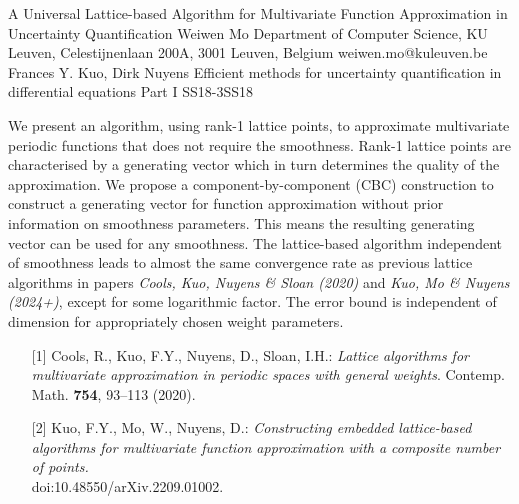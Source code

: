\begin{talk}
  {A Universal Lattice-based Algorithm for Multivariate Function Approximation in Uncertainty Quantification}%
  {Weiwen Mo}%
  {Department of Computer Science, KU Leuven, Celestijnenlaan 200A, 3001 Leuven, Belgium}%
  {weiwen.mo@kuleuven.be}%
  {Frances Y. Kuo, Dirk Nuyens}%
{Efficient methods for uncertainty quantification in differential equations Part I}
{}{SS18-3}{SS18}

			
We present an algorithm, using rank-1 lattice points,  to approximate multivariate periodic functions that does not require the smoothness. Rank-1 lattice points are characterised by a generating vector which in turn determines the quality of the approximation. We propose a component-by-component (CBC) construction to construct a generating vector for function approximation without prior information on smoothness parameters. This means the resulting generating vector can be used for any smoothness. The lattice-based algorithm independent of smoothness leads to almost the same convergence rate as previous lattice algorithms in papers \emph{Cools, Kuo, Nuyens \& Sloan \textup{(}2020\textup{)}} and \emph{Kuo, Mo \& Nuyens \textup{(}2024+\textup{)}}, except for some logarithmic factor. 
The error bound is independent of dimension for appropriately chosen weight parameters.

\medskip

\begin{enumerate}
	\item[{[1]}] Cools, R., Kuo, F.Y., Nuyens, D., Sloan, I.H.: {\it Lattice algorithms for multivariate approximation in periodic spaces with general weights}. Contemp. Math. \textbf{754}, 93--113 (2020).
	\item[{[2]}] Kuo, F.Y., Mo, W., Nuyens, D.: {\it Constructing embedded lattice-based algorithms for multivariate function approximation with a composite number of points.} \\ doi:10.48550/arXiv.2209.01002.
\end{enumerate}

\end{talk}

